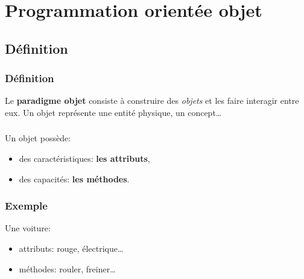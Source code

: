 \documentclass[svgnames,11pt]{beamer}
\begin{document}
\section{Programmation orientée objet}
\subsection{Définition}
\begin{frame}
    \frametitle{Définition}

    Le \textbf{paradigme objet} consiste à construire des \emph{objets} et les faire interagir entre eux. Un objet représente une entité physique, un concept\dots  

\end{frame}
\begin{frame}
    \frametitle{}

    Un objet possède:
    \begin{itemize}
        \item des caractéristiques: \textbf{les attributs},
        \item des capacités: \textbf{les méthodes}.
    \end{itemize}

\end{frame}
\begin{frame}
    \frametitle{Exemple
    }

    Une voiture:
    \begin{itemize}
        \item attributs: rouge, électrique\dots
        \item méthodes: rouler, freiner\dots
    \end{itemize}

\end{frame}
\end{document}
